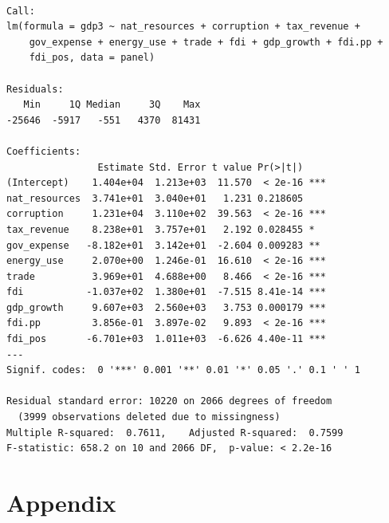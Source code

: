 \documentclass[
  letterpaper,
  DIV=11,
  numbers=noendperiod]{scrartcl}
\begin{document}
\begin{verbatim}

Call:
lm(formula = gdp3 ~ nat_resources + corruption + tax_revenue + 
    gov_expense + energy_use + trade + fdi + gdp_growth + fdi.pp + 
    fdi_pos, data = panel)

Residuals:
   Min     1Q Median     3Q    Max 
-25646  -5917   -551   4370  81431 

Coefficients:
                Estimate Std. Error t value Pr(>|t|)    
(Intercept)    1.404e+04  1.213e+03  11.570  < 2e-16 ***
nat_resources  3.741e+01  3.040e+01   1.231 0.218605    
corruption     1.231e+04  3.110e+02  39.563  < 2e-16 ***
tax_revenue    8.238e+01  3.757e+01   2.192 0.028455 *  
gov_expense   -8.182e+01  3.142e+01  -2.604 0.009283 ** 
energy_use     2.070e+00  1.246e-01  16.610  < 2e-16 ***
trade          3.969e+01  4.688e+00   8.466  < 2e-16 ***
fdi           -1.037e+02  1.380e+01  -7.515 8.41e-14 ***
gdp_growth     9.607e+03  2.560e+03   3.753 0.000179 ***
fdi.pp         3.856e-01  3.897e-02   9.893  < 2e-16 ***
fdi_pos       -6.701e+03  1.011e+03  -6.626 4.40e-11 ***
---
Signif. codes:  0 '***' 0.001 '**' 0.01 '*' 0.05 '.' 0.1 ' ' 1

Residual standard error: 10220 on 2066 degrees of freedom
  (3999 observations deleted due to missingness)
Multiple R-squared:  0.7611,    Adjusted R-squared:  0.7599 
F-statistic: 658.2 on 10 and 2066 DF,  p-value: < 2.2e-16
\end{verbatim}

\pagebreak

\section{Appendix}\label{appendix}
\end{document}
